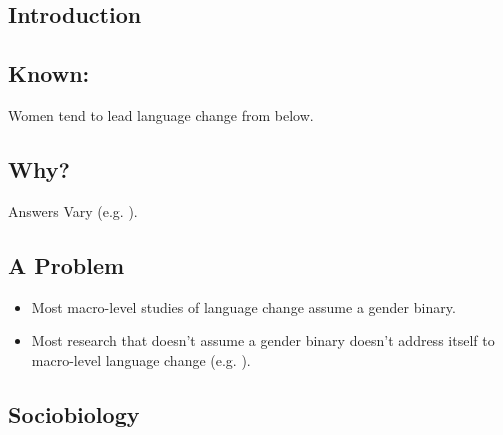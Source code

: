 \documentclass[a0,portrait]{a0poster}
\begin{document}
\begin{multicols}{2} %


\section*{Introduction}

\color{Navy} %
\subsection*{Known:}
\Large
Women tend to lead language change from below.

\color{SaddleBrown}
\subsection*{Why?}

Answers Vary (e.g. \citealt{labov2001, eckert2011}).

\color{Navy}
\subsection*{A Problem}

\begin{itemize}
	\item Most macro-level studies of language change assume a gender binary.
	\item Most research that doesn't assume a gender binary doesn't address itself to macro-level language change (e.g. \citet{zimmanetal2014}).
\end{itemize}



\color{DarkSlateGray} %
\subsection*{Sociobiology}


\end{multicols}
\end{document}
